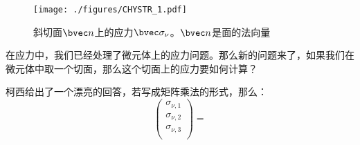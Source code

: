

\begin{figure}[ht]
\centering
\texttt{[image: ./figures/CHYSTR\_1.pdf]}
\caption{斜切面$\bvec n$上的应力$\bvec \sigma_\nu$。$\bvec n$是面的法向量} \label{CHYSTR_fig1}
\end{figure}

在应力中，我们已经处理了微元体上的应力问题。那么新的问题来了，如果我们在微元体中取一个切面，那么这个切面上的应力要如何计算？

柯西给出了一个漂亮的回答，若写成矩阵乘法的形式，那么：
\begin{equation}
\begin{pmatrix}
\sigma_{\nu,1}\\
\sigma_{\nu,2}\\
\sigma_{\nu,3}\\
\end{pmatrix}
=
\end{equation}
